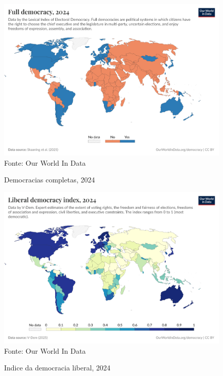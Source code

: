 \begin{figure}[ht]
    \centering
    \caption{Democracias completas, 2024}
    \includegraphics[width=1\linewidth]{figuras/democracia/full-democracy-lexical.png}
    \label{fig:full-democracy-lexical}
    \footnotesize{Fonte: Our World In Data}
\end{figure}

\begin{figure}[ht]
    \centering
    \caption{Indice da democracia liberal, 2024}
    \includegraphics[width=1\linewidth]{figuras/democracia/liberal-democracy-index.png}
    \label{fig:liberal-democracy-index}
    \footnotesize{Fonte: Our World In Data}
\end{figure}


